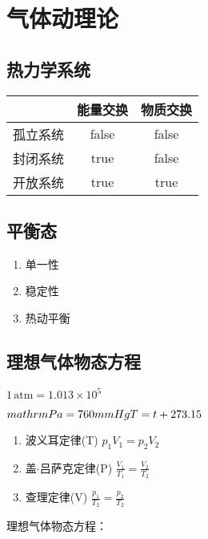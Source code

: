 \chapter{气体动理论}
\newpage

\section{热力学系统}

\begin{table}[!htbp]
    \centering
    \begin{tabular}{l|c|c}
        \toprule
                 & 能量交换 & 物质交换 \\
        \midrule
        孤立系统 & false    & false    \\
        封闭系统 & true     & false    \\
        开放系统 & true     & true     \\
        \bottomrule
    \end{tabular}
\end{table}

\section{平衡态}

\begin{enumerate}
    \item 单一性
    \item 稳定性
    \item 热动平衡
\end{enumerate}

\section{理想气体物态方程}

$1\,\mathrm{atm}=1.013\times10^5$

$mathrm{Pa}=760mmHg\\T=t+273.15$

\begin{enumerate}
    \item 波义耳定律(T)
          $p_1V_1=p_2V_2$
    \item 盖$\cdot$吕萨克定律(P)
          $\frac{V_1}{T_1}=\frac{V_2}{T_2}$
    \item 查理定律(V)
          $\frac{p_1}{T_2}=\frac{p_2}{T_2}$
\end{enumerate}

理想气体物态方程：

